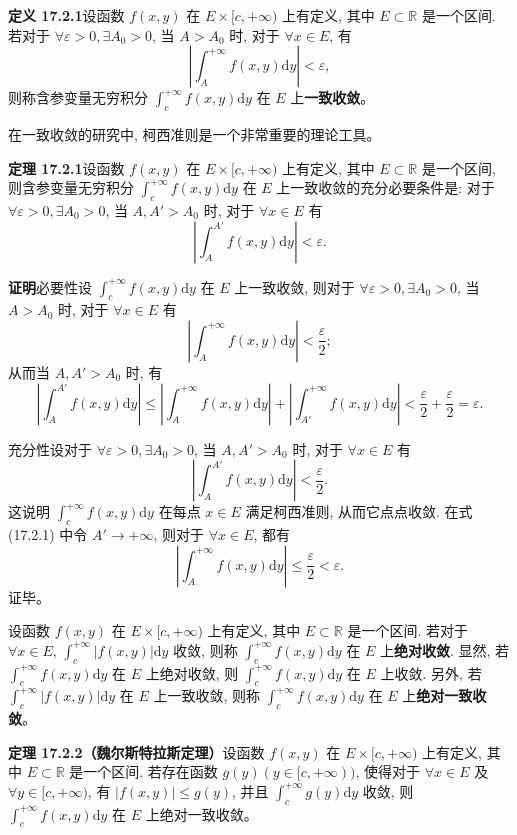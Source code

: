 \documentclass[UTF8, 12pt, fontset=fandol, oneside]{ctexart}
\begin{document}
\noindent\textbf{定义 17.2.1}\quad 设函数 $f(x,y)$ 在 $E\times[c,+\infty)$ 上有定义, 其中 $E\subset\mathbb R$ 是一个区间. 若对于 $\forall\varepsilon>0,\exists A_0>0$, 当 $A>A_0$ 时, 对于 $\forall x\in E$, 有
\[
  \left|\int_A^{+\infty}f(x,y)\mathrm dy\right|<\varepsilon,
\]
则称含参变量无穷积分 $\int_c^{+\infty}f(x,y)\mathrm dy$ 在 $E$ 上\textbf{一致收敛}。

在一致收敛的研究中, 柯西准则是一个非常重要的理论工具。

\noindent\textbf{定理 17.2.1}\quad 设函数 $f(x,y)$ 在 $E\times[c,+\infty)$ 上有定义, 其中 $E\subset\mathbb R$ 是一个区间, 则含参变量无穷积分 $\int_c^{+\infty}f(x,y)\mathrm dy$ 在 $E$ 上一致收敛的充分必要条件是: 对于 $\forall\varepsilon>0,\exists A_0>0$, 当 $A,A'>A_0$ 时, 对于 $\forall x\in E$ 有
\[
  \left|\int_A^{A'}f(x,y)\mathrm dy\right|<\varepsilon.
\]

\noindent\textbf{证明}\quad 必要性\quad 设 $\int_c^{+\infty}f(x,y)\mathrm dy$ 在 $E$ 上一致收敛, 则对于 $\forall\varepsilon>0,\exists A_0>0$, 当 $A>A_0$ 时, 对于 $\forall x\in E$ 有
\[
  \left|\int_A^{+\infty}f(x,y)\mathrm dy\right|<\frac{\varepsilon}{2};
\]
从而当 $A,A'>A_0$ 时, 有
\[
  \left|\int_A^{A'}f(x,y)\mathrm dy\right|
  \leqslant\left|\int_A^{+\infty}f(x,y)\mathrm dy\right|
    +\left|\int_{A'}^{+\infty}f(x,y)\mathrm dy\right|
  <\frac{\varepsilon}{2}+\frac{\varepsilon}{2}=\varepsilon.
\]

充分性\quad 设对于 $\forall\varepsilon>0,\exists A_0>0$, 当 $A,A'>A_0$ 时, 对于 $\forall x\in E$ 有
\[
  \left|\int_A^{A'}f(x,y)\mathrm dy\right|<\frac{\varepsilon}{2}.
  \tag{17.2.1}
\]
这说明 $\int_c^{+\infty}f(x,y)\mathrm dy$ 在每点 $x\in E$ 满足柯西准则, 从而它点点收敛. 在式 (17.2.1) 中令 $A'\to+\infty$, 则对于 $\forall x\in E$, 都有
\[
  \left|\int_A^{+\infty}f(x,y)\mathrm dy\right|\leqslant\frac{\varepsilon}{2}<\varepsilon.
\]
证毕。

设函数 $f(x,y)$ 在 $E\times[c,+\infty)$ 上有定义, 其中 $E\subset\mathbb R$ 是一个区间. 若对于 $\forall x\in E$, $\int_c^{+\infty}|f(x,y)|\mathrm dy$ 收敛, 则称 $\int_c^{+\infty}f(x,y)\mathrm dy$ 在 $E$ 上\textbf{绝对收敛}. 显然, 若 $\int_c^{+\infty}f(x,y)\mathrm dy$ 在 $E$ 上绝对收敛, 则 $\int_c^{+\infty}f(x,y)\mathrm dy$ 在 $E$ 上收敛. 另外, 若 $\int_c^{+\infty}|f(x,y)|\mathrm dy$ 在 $E$ 上一致收敛, 则称 $\int_c^{+\infty}f(x,y)\mathrm dy$ 在 $E$ 上\textbf{绝对一致收敛}。

\noindent\textbf{定理 17.2.2（魏尔斯特拉斯定理）}\quad 设函数 $f(x,y)$ 在 $E\times[c,+\infty)$ 上有定义, 其中 $E\subset\mathbb R$ 是一个区间. 若存在函数 $g(y)(y\in[c,+\infty))$, 使得对于 $\forall x\in E$ 及 $\forall y\in[c,+\infty)$, 有 $|f(x,y)|\leqslant g(y)$, 并且 $\int_c^{+\infty}g(y)\mathrm dy$ 收敛, 则 $\int_c^{+\infty}f(x,y)\mathrm dy$ 在 $E$ 上绝对一致收敛。
\end{document}

